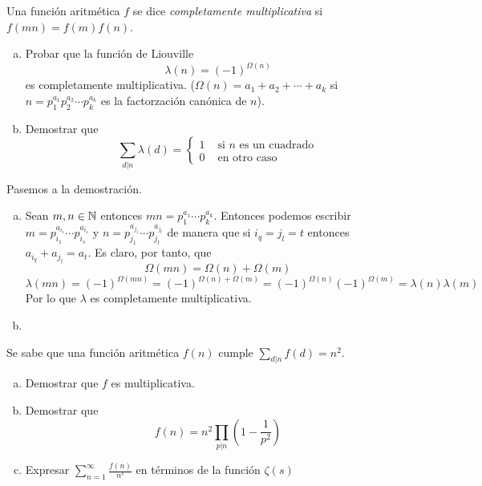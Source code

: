 \documentclass[twoside]{article}
\begin{document}
\begin{ejercicio}{6}
Una función aritmética $f$ se dice \textit{completamente multiplicativa} si $f(mn)=f(m)f(n)$.
\begin{enumerate}[(a)]
\item Probar que la función de Liouville
	\[ λ(n) = (-1)^{Ω(n)} \]
	es completamente multiplicativa. ($Ω(n) = a_1+a_2+\cdots+a_k$ si $n=p_1^{a_1}p_2^{a_2}\cdots p_k^{a_k}$ es la factorzación canónica de $n$).
\item Demostrar que
	\[ \sum_{d|n} λ(d) = \begin{cases}
		1 &\text{ si }n\text{ es un cuadrado}\\
		0 &\text{ en otro caso}
	\end{cases}\]
\end{enumerate}
\end{ejercicio}
\begin{solucion}
Pasemos a la demostración.
\begin{enumerate}[(a)]
\item Sean $m,n\in \mathbb{N}$ entonces $mn = p_1^{a_1}\cdots p_k^{a_k}$. Entonces podemos escribir $m=p_{i_1}^{a_{i_1}}\cdots p_{i_s}^{a_{i_s}}$ y $n=p_{j_1}^{a_{j_1}}\cdots p_{j_t}^{a_{j_t}}$ de manera que si $i_q=j_l = t$ entonces $a_{i_q}+a_{j_l}=a_t$. Es claro, por tanto, que 
$$ \Omega(mn) = \Omega(n)+\Omega(m) $$ $$ \lambda(mn) = (-1)^{\Omega(mn)}=(-1)^{ \Omega(n)+\Omega(m)} = (-1)^{\Omega(n)}(-1)^{\Omega(m)} = \lambda(n)\lambda(m)
$$
Por lo que $\lambda$ es completamente multiplicativa.
\item 
\end{enumerate}
\end{solucion}
\newpage

\begin{ejercicio}{7}
Se sabe que una función aritmética $f(n)$ cumple $\sum_{d|n} f(d) = n^2$.
\begin{enumerate}[(a)]
\item Demostrar que $f$ es multiplicativa.
\item Demostrar que
\[ f(n) = n^2 \prod_{p|n} \left(1-\frac{1}{p^2}\right)\]
\item Expresar $\sum_{n=1}^{∞} \frac{f(n)}{n^s}$ en términos de la función $ζ(s)$
\end{enumerate}
\end{ejercicio}
\begin{solucion}
\end{solucion}
\newpage
\end{document}
